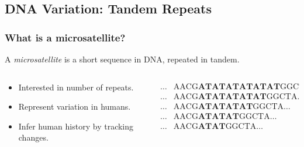 \documentclass[11pt]{beamer}
\begin{document}
	\subsection{DNA Variation: Tandem Repeats}\label{subsec:dvtr}
    \begin{frame}
        \frametitle{What is a microsatellite?}
        \begin{definition}[Microsatellite]
            A \emph{microsatellite} is a short sequence in DNA, repeated in tandem.
        \end{definition} \bigskip

        \begin{columns}
            \begin{column}{0.4\textwidth}
                \begin{itemize}
                    \item Interested in number of repeats.
                    \item Represent variation in humans.
                    \item Infer human history by tracking changes.
                \end{itemize}
            \end{column}
            \begin{column}{0.6\textwidth}
                \begin{equation*}
                    \begin{aligned}
                         \ldots &\text{AACG}\textbf{ATATATATATAT}\text{GGCTA} \ldots \\
                         \ldots &\text{AACG}\textbf{ATATATATAT}\text{GGCTA} \ldots \\
                         \ldots &\text{AACG}\textbf{ATATATAT}\text{GGCTA} \ldots \\
                         \ldots &\text{AACG}\textbf{ATATAT}\text{GGCTA} \ldots \\
                         \ldots &\text{AACG}\textbf{ATAT}\text{GGCTA} \ldots
                    \end{aligned}
                \end{equation*}
            \end{column}
        \end{columns}


\end{frame}
\end{document}
